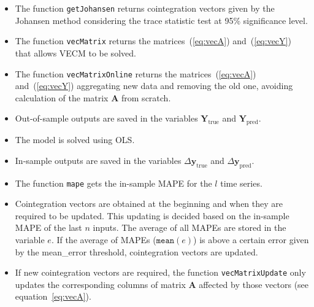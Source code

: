 \begin{itemize}
\item The function \texttt{getJohansen} returns cointegration vectors given by
the Johansen method considering the trace statistic test at 95\%
significance level.
\item The function \texttt{vecMatrix} returns the matrices~(\ref{eq:vecA})
and~(\ref{eq:vecY}) that allows VECM to be solved.
\item The function \texttt{vecMatrixOnline} returns the
matrices~(\ref{eq:vecA}) and~(\ref{eq:vecY}) aggregating new data and removing
the old one, avoiding calculation of the matrix $\mathbf{A}$ from scratch.
\item Out-of-sample outputs are saved in the variables 
$\mathbf{Y}_{\text{true}}$ and $\mathbf{Y}_{\text{pred}}$.
\item The model is solved using OLS.
\item In-sample outputs are saved in the variables $\Delta
\mathbf{y}_{\text{true}}$ and $\Delta \mathbf{y}_{\text{pred}}$.
\item The function \texttt{mape} gets the in-sample MAPE for the $l$ time
series.
\item Cointegration vectors are obtained at the beginning and when they are required to be updated. This updating is decided based on the in-sample MAPE of the last $n$ inputs. The average of all
MAPEs are stored in the variable $e$. If the average of MAPEs
($\texttt{mean}(e)$) is above a certain error given by the mean\_error threshold, cointegration vectors are updated.
\item If new cointegration vectors are required, the function
\texttt{vecMatrixUpdate} only updates the corresponding columns of matrix
$\mathbf{A}$ affected by those vectors (see equation~\ref{eq:vecA}).
\end{itemize}

